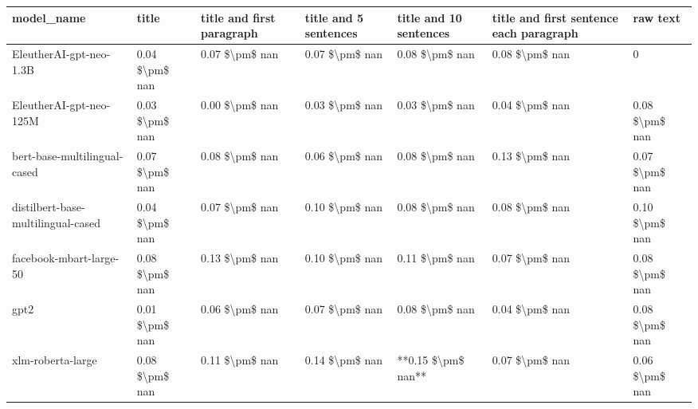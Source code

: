 \begin{tabular}{lllllll}
\toprule
                        model\_name &          title & title and first paragraph & title and 5 sentences & title and 10 sentences & title and first sentence each paragraph &       raw text \\
\midrule
           EleutherAI-gpt-neo-1.3B & 0.04 \$\textbackslash pm\$ nan &            0.07 \$\textbackslash pm\$ nan &        0.07 \$\textbackslash pm\$ nan &         0.08 \$\textbackslash pm\$ nan &                          0.08 \$\textbackslash pm\$ nan &              0 \\
           EleutherAI-gpt-neo-125M & 0.03 \$\textbackslash pm\$ nan &            0.00 \$\textbackslash pm\$ nan &        0.03 \$\textbackslash pm\$ nan &         0.03 \$\textbackslash pm\$ nan &                          0.04 \$\textbackslash pm\$ nan & 0.08 \$\textbackslash pm\$ nan \\
      bert-base-multilingual-cased & 0.07 \$\textbackslash pm\$ nan &            0.08 \$\textbackslash pm\$ nan &        0.06 \$\textbackslash pm\$ nan &         0.08 \$\textbackslash pm\$ nan &                          0.13 \$\textbackslash pm\$ nan & 0.07 \$\textbackslash pm\$ nan \\
distilbert-base-multilingual-cased & 0.04 \$\textbackslash pm\$ nan &            0.07 \$\textbackslash pm\$ nan &        0.10 \$\textbackslash pm\$ nan &         0.08 \$\textbackslash pm\$ nan &                          0.08 \$\textbackslash pm\$ nan & 0.10 \$\textbackslash pm\$ nan \\
           facebook-mbart-large-50 & 0.08 \$\textbackslash pm\$ nan &            0.13 \$\textbackslash pm\$ nan &        0.10 \$\textbackslash pm\$ nan &         0.11 \$\textbackslash pm\$ nan &                          0.07 \$\textbackslash pm\$ nan & 0.08 \$\textbackslash pm\$ nan \\
                              gpt2 & 0.01 \$\textbackslash pm\$ nan &            0.06 \$\textbackslash pm\$ nan &        0.07 \$\textbackslash pm\$ nan &         0.08 \$\textbackslash pm\$ nan &                          0.04 \$\textbackslash pm\$ nan & 0.08 \$\textbackslash pm\$ nan \\
                 xlm-roberta-large & 0.08 \$\textbackslash pm\$ nan &            0.11 \$\textbackslash pm\$ nan &        0.14 \$\textbackslash pm\$ nan &     **0.15 \$\textbackslash pm\$ nan** &                          0.07 \$\textbackslash pm\$ nan & 0.06 \$\textbackslash pm\$ nan \\
\bottomrule
\end{tabular}

